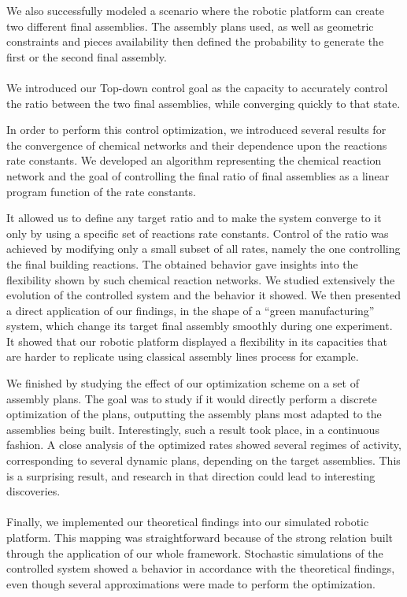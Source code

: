	We also successfully modeled a scenario where the robotic platform can create two different final assemblies. The assembly plans used, as well as geometric constraints and pieces availability then defined the probability to generate the first or the second final assembly.
	
	\paragraph{}
	We introduced our Top-down control goal as the capacity to accurately control the ratio between the two final assemblies, while converging quickly to that state.
	
	In order to perform this control optimization, we introduced several results for the convergence of chemical networks and their dependence upon the reactions rate constants. We developed an algorithm representing the chemical reaction network and the goal of controlling the final ratio of final assemblies as a linear program function of the rate constants.
	
	It allowed us to define any target ratio and to make the system converge to it only by using a specific set of reactions rate constants. Control of the ratio was achieved by modifying only a small subset of all rates, namely the one controlling the final building reactions. The obtained behavior gave insights into the flexibility shown by such chemical reaction networks. We studied extensively the evolution of the controlled system and the behavior it showed. We then presented a direct application of our findings, in the shape of a ``green manufacturing'' system, which change its target final assembly smoothly during one experiment. It showed that our robotic platform displayed a flexibility in its capacities that are harder to replicate using classical assembly lines process for example.
	
	We finished by studying the effect of our optimization scheme on a set of assembly plans. The goal was to study if it would directly perform a discrete optimization of the plans, outputting the assembly plans most adapted to the assemblies being built. Interestingly, such a result took place, in a continuous fashion. A close analysis of the optimized rates showed several regimes of activity, corresponding to several dynamic plans, depending on the target assemblies. This is a surprising result, and research in that direction could lead to interesting discoveries.
	
	\paragraph{}
	Finally, we implemented our theoretical findings into our simulated robotic platform. This mapping was straightforward because of the strong relation built through the application of our whole framework. Stochastic simulations of the controlled system showed a behavior in accordance with the theoretical findings, even though several approximations were made to perform the optimization.
	
